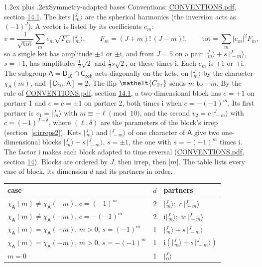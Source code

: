 \documentclass[10pt,a4paper]{article}
\makeatletter
\renewcommand\section{\@startsection{section}{1}{\z@}{-3ex plus -1ex minus -.2ex}%
  {1.2ex plus .2ex}{\normalfont\large\sffamily\bfseries\color{parttitle}}}
\numberwithin{equation}{section}
\newcommand{\eltfont}[1]{{\let\sigma\eltsigma\mathelt{#1}}}
\newcommand{\grp}[1]{\mathsf{#1}}
\newcommand{\elt}[1]{\eltfont{#1}}
\newcommand{\grpindex}[2]{[#1 : #2]}
\newcommand{\iunit}{\mathrm{i}}
\newcommand{\chiA}{\chi_{\grp{A}}}
\newcommand{\jm}[2]{\bigl\lvert{}^{#1}_{\,#2}\bigr\rangle}
\makeatother
\begin{document}
\section{Symmetry-adapted bases}\label{s:bases}
Conventions: \href{../../CONVENTIONS.pdf}{CONVENTIONS.pdf}, section \href{../../CONVENTIONS.pdf\#conv.14.1}{14.1}.
\leavevmode\label{n:index.m}\label{n:vector.ket}The kets $\jm{J}{m}$ are the spherical harmonics (the inversion acts as $(-1)^J$). \label{n:index.ketcoefficient}\label{n:vector.basis.symmetry}\label{n:index.ketweight}\label{n:index.total}A vector is listed by its coefficients $e_m$:
\begin{equation}\label{e:ket}v = \frac{1}{\sqrt{\mathrm{tot}}}\sum_m e_m\sqrt{F_m}\;\jm{J}{m},\qquad F_m = (J+m)!\,(J-m)!,\qquad \mathrm{tot} = \sum_m |e_m|^2F_m,\end{equation}
\leavevmode\label{n:index.pair.sign}so a single ket has amplitude $\pm1$ or $\pm\iunit$, and from $J = 5$ on a pair $\jm{J}{m} + s\,\jm{J}{-m}$, $s = \pm1$, has amplitudes $\tfrac{1}{2}\sqrt{2}$ and $\tfrac{1}{2}s\sqrt{2}$, or these times $\iunit$. Each $e_m$ is $\pm1$ or $\pm\iunit$.
\leavevmode\label{n:group.A}\label{n:function.character.abelian}The subgroup $\grp{A} = \grp{D_{10}}\cap\grp{C_{\infty h}}$ acts diagonally on the kets, on $\jm{J}{m}$ by the character $\chiA(m)$, and $\grpindex{\grp{D_{10}}}{\grp{A}} = 2$. The flip $\elt{C_{2x}}$ sends $m$ to $-m$. \label{n:index.partner.sign}By the rule of \href{../../CONVENTIONS.pdf}{CONVENTIONS.pdf}, section \href{../../CONVENTIONS.pdf\#conv.14.1}{14.1}, a two-dimensional block has $e = +1$ on partner 1 and $e = c = \pm1$ on partner 2, both times $\iunit$ when $c = -(-1)^m$. Its first partner is $v_1 = \jm{J}{m}$ with $m \equiv -\ell \pmod{10}$, and the second $v_2 = c\,\jm{J}{-m}$ with $c = (-1)^{J+\delta}$, where $(\ell, \delta)$ are the parameters of the block's irrep (section~\ref{s:irreps2}). Kets $\jm{J}{m}$ and $\jm{J}{-m}$ of one character of $\grp{A}$ give two one-dimensional blocks $\jm{J}{m} + s\,\jm{J}{-m}$, $s = \pm1$, the one with $s = -(-1)^m$ times $\iunit$. The factor $\iunit$ makes each block adapted to time reversal (\href{../../CONVENTIONS.pdf}{CONVENTIONS.pdf}, section \href{../../CONVENTIONS.pdf\#conv.14}{14}). Blocks are ordered by $J$, then irrep, then $|m|$.
\leavevmode\label{n:head.case}\label{n:head.partners}The table lists every case of block, its dimension $d$ and its partners in order.
\begin{center}\begin{tabular}{@{}lrl@{}}\toprule
case & $d$ & partners\\\midrule
$\chiA(m) \ne \chiA(-m)$, $c = (-1)^m$ & 2 & $\jm{J}{m}$;\ $c\,\jm{J}{-m}$\\
$\chiA(m) \ne \chiA(-m)$, $c = -(-1)^m$ & 2 & $\iunit\jm{J}{m}$;\ $\iunit c\,\jm{J}{-m}$\\
$\chiA(m) = \chiA(-m)$, $m > 0$, $s = (-1)^m$ & 1 & $\jm{J}{m} + s\,\jm{J}{-m}$\\
$\chiA(m) = \chiA(-m)$, $m > 0$, $s = -(-1)^m$ & 1 & $\iunit(\jm{J}{m} + s\,\jm{J}{-m})$\\
$m = 0$ & 1 & $\jm{J}{0}$\\
\bottomrule\end{tabular}\end{center}
\end{document}
